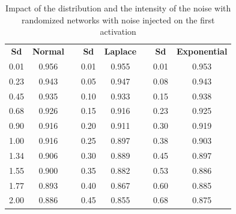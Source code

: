 \begin{table}[htbp]
  \centering
  \caption{Impact of the distribution and the intensity of the noise with randomized networks with noise injected on the first activation}
  \label{table:ap2-acc_noise_activation-appendix}%
    \begin{tabular}{rcrrcrrc}
    \toprule
    \multicolumn{1}{c}{\textbf{Sd}} & \textbf{Normal} &       & \multicolumn{1}{c}{\textbf{Sd}} & \textbf{Laplace} &       & \multicolumn{1}{c}{\textbf{Sd}} & \textbf{Exponential} \\
    \cmidrule{1-2}\cmidrule{4-5}\cmidrule{7-8}    0.01  & 0.956 &       & 0.01  & 0.955 &       & 0.01  & 0.953 \\
    0.23  & 0.943 &       & 0.05  & 0.947 &       & 0.08  & 0.943 \\
    0.45  & 0.935 &       & 0.10  & 0.933 &       & 0.15  & 0.938 \\
    0.68  & 0.926 &       & 0.15  & 0.916 &       & 0.23  & 0.925 \\
    0.90  & 0.916 &       & 0.20  & 0.911 &       & 0.30  & 0.919 \\
    1.00  & 0.916 &       & 0.25  & 0.897 &       & 0.38  & 0.903 \\
    1.34  & 0.906 &       & 0.30  & 0.889 &       & 0.45  & 0.897 \\
    1.55  & 0.900 &       & 0.35  & 0.882 &       & 0.53  & 0.886 \\
    1.77  & 0.893 &       & 0.40  & 0.867 &       & 0.60  & 0.885 \\
    2.00  & 0.886 &       & 0.45  & 0.855 &       & 0.68  & 0.875 \\
    \bottomrule
    \end{tabular}%
\end{table}%


